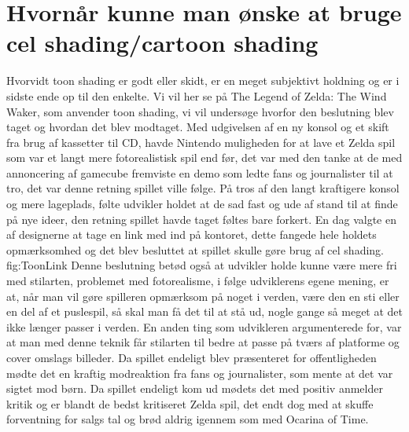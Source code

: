 \newpage
\section{Hvornår kunne man ønske at bruge cel shading/cartoon shading}

Hvorvidt toon shading er godt eller skidt, er en meget subjektivt holdning og er i sidste ende op til den enkelte. Vi vil her se på The Legend of Zelda: The Wind Waker, som anvender toon shading, vi vil undersøge hvorfor den beslutning blev taget og hvordan det blev modtaget. Med udgivelsen af en ny konsol og et skift fra brug af kassetter til CD, havde Nintendo muligheden for at lave et Zelda spil som var et langt mere fotorealistisk spil end før, det var med den tanke at de med annoncering af gamecube fremviste en demo\cite{Zelda} som ledte fans og journalister til at tro, det var denne retning spillet ville følge. På tros af den langt kraftigere konsol og mere lageplads, følte udvikler holdet at de sad fast og ude af stand til at finde på nye\cite{Zelda} ideer, den retning spillet havde taget føltes bare forkert. En dag valgte en af designerne at tage en\cite{ToonLinkIsBorn} link med ind på kontoret, dette fangede hele holdets opmærksomhed og det blev besluttet at spillet skulle gøre brug af cel shading.
 {} {fig:ToonLink}
Denne beslutning betød også at udvikler holde kunne være mere fri med stilarten, problemet med fotorealisme, i følge udviklerens egene mening, er at, når man vil gøre spilleren opmærksom på noget i verden, være den en sti eller en del af et puslespil, så skal man få det til at stå ud, nogle gange så meget at det ikke længer passer i verden. En anden ting som udvikleren argumenterede for, var at man med denne teknik får stilarten til bedre at passe på tværs af platforme og cover omslags \cite{nintendo}billeder. Da spillet endeligt blev præsenteret for offentligheden mødte det en kraftig modreaktion fra fans og journalister, som mente at det var sigtet mod \cite{nintendo} børn. Da spillet endeligt kom ud mødets det med positiv\cite{BigScore} anmelder kritik og er blandt de bedst kritiseret Zelda spil, det endt dog med at skuffe forventning for salgs tal og brød aldrig igennem som med Ocarina of Time.